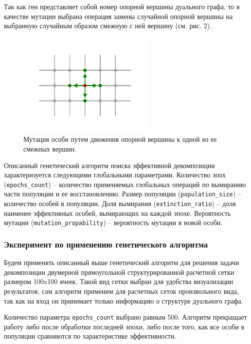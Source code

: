 Так как ген представляет собой номер опорной вершины дуального графа, то в качестве мутации выбрана операция замены случайной опорной вершины на выбранную случайным образом смежную с ней вершину (см. рис. 2).

\begin{figure}[ht]
	\centering
		\includegraphics[width=0.6\textwidth]{./pics/text_2_genetic/mutation.pdf}
	\caption{Мутация особи путем движения опорной вершины к одной из ее смежных вершин.}
	\label{fig:text_2_genetic_mutation}
\end{figure}

Описанный генетический алгоритм поиска эффективной декомпозиции характеризуется следующими глобальными параметрами. Количество эпох (\texttt{epochs\_count}) – количество применяемых глобальных операций по вымиранию части популяции и ее восстановлению.
Размер популяции (\texttt{population\_size}) – количество особей в популяции. Доля вымирания (\texttt{extinction\_ratio}) – доля наименее эффективных особей, вымирающих на каждой эпохе.
Вероятность мутации (\texttt{mutation\_propability}) – вероятность мутации в новой особи.

\subsubsection{Эксперимент по применению генетического алгоритма}

Будем применять описанный выше генетический алгоритм для решения задачи декомпозиции двумерной прямоугольной структурированной расчетной сетки размером 100x100 ячеек.
Такой вид сетки выбран для удобства визуализации результатов, сам алгоритм применим для расчетных сеток произвольного вида, так как на вход он принимает только информацию о структуре дуального графа.

Количество параметра \texttt{epochs\_count} выбрано равным 500.
Алгоритм прекращает работу либо после обработки последней эпохи, либо после того, как все особи в популяции сравняются по характеристике эффективности.

